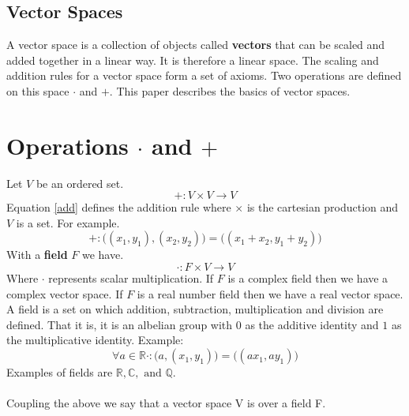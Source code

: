 \documentclass[a4paper]{article}
\begin{document}
\subsection{Vector Spaces}
A vector space is a collection of objects called \textbf{vectors} that can be scaled and added together in a linear way. It is therefore a linear space. The scaling and addition rules for a vector space form a set of axioms. Two operations are defined on this space $\cdot$ and $+$. This paper describes the basics of vector spaces.
\section{Operations $\cdot$ and $+$}
Let $V$ be an ordered set.
\label{operations}
\begin{equation}
  \label{add}
  +:V \times V \to V
\end{equation}
Equation \ref{add} defines the addition rule where $\times$ is the cartesian production\cite{A002} and $V$ is a set. For example.
\begin{equation}
  +:\big((x_1, y_1),(x_2,y_2)\big) = \big((x_1+x_2,y_1+y_2)\big)
\end{equation}
 With a \textbf{field}\cite{wiki:mathfield} $F$ we have.
\begin{equation}
  \cdot : F \times V \to V
\end{equation}
Where $\cdot$ represents scalar multiplication. If $F$ is a complex field then we have a complex vector space. If $F$ is a real number field then we have a real vector space. A field is a set on which addition, subtraction, multiplication and division are defined. That it is, it is an albelian group with $0$ as the additive identity and $1$ as the multiplicative identity. Example:
\begin{equation}
\forall a\in \mathbb{R}  \cdot:\big(a,(x_1,y_1)\big) = \big((ax_1,ay_1)\big)
\end{equation}
Examples of fields are $\mathbb{R}, \mathbb{C}, \text{ and } \mathbb{Q}$.\\ \\
Coupling the above we say that a vector space V is over a field F.
\end{document}
